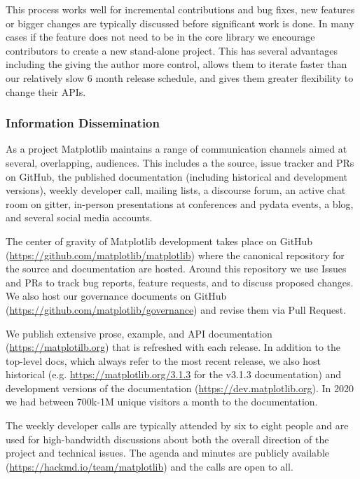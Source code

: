 \documentclass[12pt]{article}
\numberwithin{page}{section}
\begin{document}
This process works well for incremental contributions and bug fixes,
new features or bigger changes are typically discussed before
significant work is done.  In many cases if the feature does not need
to be in the core library we encourage contributors to create a new
stand-alone project.  This has several advantages including the giving
the author more control, allows them to iterate faster than our
relatively slow 6 month release schedule, and gives them greater
flexibility to change their APIs.


\subsubsection{Information Dissemination}

As a project Matplotlib maintains a range of communication channels
aimed at several, overlapping, audiences.  This includes a
the source, issue tracker and PRs on GitHub,
the published documentation (including historical and development versions),
weekly developer call,
mailing lists,
a discourse forum,
an active chat room on gitter,
in-person presentations at conferences and pydata events,
a blog, and several social media accounts.


The center of gravity of Matplotlib development takes place on GitHub
(\url{https://github.com/matplotlib/matplotlib}) where the canonical
repository for the source and documentation are hosted.  Around this
repository we use Issues and PRs to track bug reports, feature
requests, and to discuss proposed changes.  We also host our
governance documents on GitHub
(\url{https://github.com/matplotlib/governance}) and revise them via
Pull Request.

We publish extensive prose, example, and API documentation
(\url{https://matplotilb.org}) that is refreshed with each release.
In addition to the top-level docs, which always refer to the most
recent release, we also host historical
(e.g. \url{https://matplotlib.org/3.1.3} for the v3.1.3 documentation) and
development versions of the documentation
(\url{https://dev.matplotlib.org}).  In 2020 we had between 700k-1M
unique visitors a month to the documentation.


The weekly developer calls are typically attended by six to eight
people and are used for high-bandwidth discussions about both the
overall direction of the project and technical issues.  The agenda and
minutes are publicly available
(\url{https://hackmd.io/team/matplotlib}) and the calls are open to
all.
\end{document}
